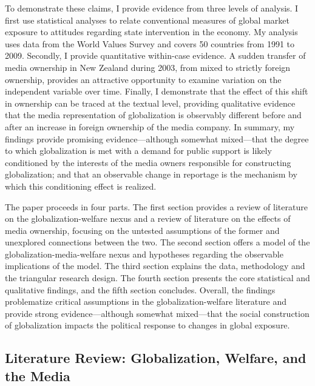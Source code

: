 \documentclass[12pt]{article}
\begin{document}
	To demonstrate these claims, I provide evidence from three levels of analysis. I first use statistical analyses to relate conventional measures of global market exposure to attitudes regarding state intervention in the economy. My analysis uses data from the World Values Survey and covers 50 countries from 1991 to 2009. Secondly, I provide quantitative within-case evidence. A sudden transfer of media ownership in New Zealand during 2003, from mixed to strictly foreign ownership, provides an attractive opportunity to examine variation on the independent variable over time. Finally, I demonstrate that the effect of this shift in ownership can be traced at the textual level, providing qualitative evidence that the media representation of globalization is observably different before and after an increase in foreign ownership of the media company. In summary, my findings provide promising evidence---although somewhat mixed---that the degree to which globalization is met with a demand for public support is likely conditioned by the interests of the media owners responsible for constructing globalization; and that an observable change in reportage is the mechanism by which this conditioning effect is realized.

The paper proceeds in four parts. The first section provides a review of literature on the globalization-welfare nexus and a review of literature on the effects of media ownership, focusing on the untested assumptions of the former and unexplored connections between the two. The second section offers a model of the globalization-media-welfare nexus and hypotheses regarding the observable implications of the model. The third section explains the data, methodology and the triangular research design. The fourth section presents the core statistical and qualitative findings, and the fifth section concludes. Overall, the findings problematize critical assumptions in the globalization-welfare literature and provide strong evidence---although somewhat mixed---that the social construction of globalization impacts the political response to changes in global exposure.

\subsection{Literature Review: Globalization, Welfare, and the Media}
\end{document}

